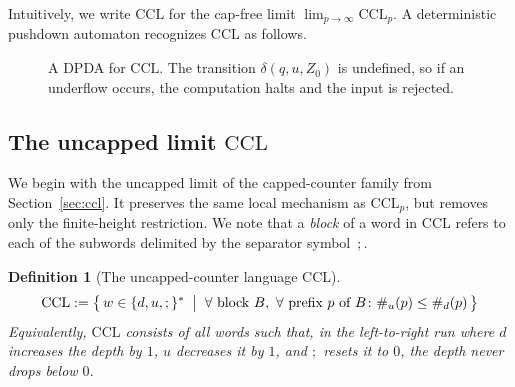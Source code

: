 \documentclass[11pt,a4paper]{article}
\newtheorem{definition}[theorem]{Definition}
\begin{document}
Intuitively, we write $\mathrm{CCL}$ for the cap-free limit $\lim_{p\to\infty}\mathrm{CCL}_p$. A deterministic pushdown automaton recognizes $\mathrm{CCL}$ as follows.

\begin{figure}[H]
\centering
{}
\caption{A DPDA for $\mathrm{CCL}$. The transition $\delta(q,u,Z_0)$ is undefined, so if an underflow occurs, the computation halts and the input is rejected.}
\label{fig:ccl-dpda}
\end{figure}

\subsection{The uncapped limit \texorpdfstring{$\mathrm{CCL}$}{CCL}}
\label{ssec:ccl-infty}

We begin with the uncapped limit of the capped-counter family from Section~\ref{sec:ccl}. It preserves the same local mechanism as $\mathrm{CCL}_p$, but removes only the finite-height restriction. We note that a \emph{block} of a word in $\mathrm{CCL}$ refers to each of the subwords delimited by the separator symbol~$;$.

\begin{definition}[The uncapped-counter language \texorpdfstring{$\mathrm{CCL}$}{CCL}]
\label{def:ccl}
\[
\mathrm{CCL} := \bigl\{\, w\in\{d,u,;\}^* \;\bigm|\; \forall\text{ block } B,\ \forall\text{ prefix } p\text{ of }B\colon \#_u(p)\le \#_d(p) \,\bigr\}
\]
Equivalently, $\mathrm{CCL}$ consists of all words such that, in the left-to-right run where $d$ increases the depth by $1$, $u$ decreases it by $1$, and $;$ resets it to $0$, the depth never drops below $0$.
\end{definition}
\end{document}
